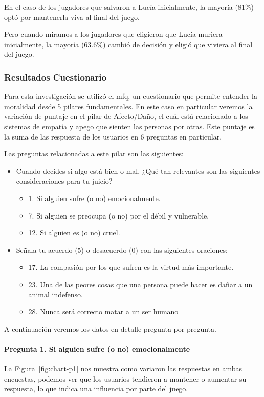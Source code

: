 En el caso de los jugadores que salvaron a Lucía inicialmente, la mayoría (81\%) optó por mantenerla viva al final del juego.

Pero cuando miramos a los jugadores que eligieron que Lucía muriera inicialmente, la mayoría (63.6\%) cambió de decisión y eligió que viviera al final del juego.

\subsubsection{Resultados Cuestionario}

Para esta investigación se utilizó el \acrlong{mfq}\cite{moral-foundation}, un cuestionario que permite entender la moralidad desde 5 pilares fundamentales. En este caso en particular veremos la variación de puntaje en el pilar de Afecto/Daño, el cuál está relacionado a los sistemas de empatía y apego que sienten las personas por otras. Este puntaje es la suma de las respuesta de los usuarios en 6 preguntas en particular.

Las preguntas relacionadas a este pilar son las siguientes:
\begin{itemize}
    \item Cuando decides si algo está bien o mal, ¿Qué tan relevantes son las siguientes consideraciones para tu juicio?
    \begin{itemize}
        \item 1. Si alguien sufre (o no) emocionalmente.
        \item 7. Si alguien se preocupa (o no) por el débil y vulnerable.
        \item 12. Si alguien es (o no) cruel.
    \end{itemize}
    \item Señala tu acuerdo (5) o desacuerdo (0) con las siguientes oraciones:
    \begin{itemize}
        \item 17. La compasión por los que sufren es la virtud más importante.
        \item 23. Una de las peores cosas que una persona puede hacer es dañar a un animal indefenso.
        \item 28. Nunca será correcto matar a un ser humano
    \end{itemize}
\end{itemize}

A continuación veremos los datos en detalle pregunta por pregunta.

\paragraph{Pregunta 1. Si alguien sufre (o no) emocionalmente}
La Figura~\ref{fig:chart-p1} nos muestra como variaron las respuestas en ambas encuestas, podemos ver que los usuarios tendieron a mantener o aumentar su respuesta, lo que indica una influencia por parte del juego.

